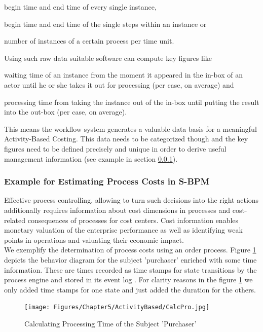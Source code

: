 \begin{list}{-}{spacing}
\item begin time and end time of every single instance,
\item begin time and end time of the single steps within an instance or
\item number of instances of a certain process per time unit.
\end{list}
Using such raw data suitable software can compute key figures like
\begin{list}{-}{spacing}
\item waiting time of an instance from the moment it appeared in the in-box of an actor until he or she takes it out for processing (per case, on average) and
\item processing time from taking the instance out of the in-box until putting the result into the out-box (per case, on average).
\end{list}

This means the workflow system generates a valuable data basis for a meaningful Activity-Based Costing. This data needs to be categorized though and the key figures need to be defined precisely and unique in order to derive useful management information (see example in section \ref{section:ExampleABC}).

\subsubsection{Example for Estimating Process Costs in S-BPM} \label{section:ExampleABC}
Effective process controlling, allowing to turn such decisions into the right actions additionally requires information about cost dimensions in processes and cost-related consequences of processes for cost centers. Cost information enables monetary valuation of the enterprise performance as well as identifying weak points in operations and valuating their economic impact.
\\
We exemplify the determination of process costs using an order process. Figure \ref{fig:CalcPro} depicts the behavior diagram for the subject 'purchaser' enriched with some time information. These are times recorded as time stamps for state transitions by the process engine and stored in its event log \cite{article:SubProcessMon}. For clarity reasons in the figure \ref{fig:CalcPro} we only added time stamps for one state and just added the duration for the others.

\begin{figure}[htbp]
	\centering
	\texttt{[image: Figures/Chapter5/ActivityBased/CalcPro.jpg]}
	\caption[Calculating Processing Time of the Subject 'Purchaser']{Calculating Processing Time of the Subject 'Purchaser'}
	\label{fig:CalcPro}
\end{figure}


